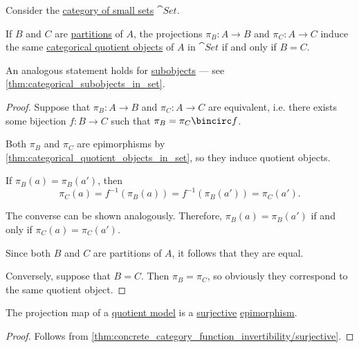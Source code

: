 \begin{proposition}\label{thm:categorical_quotient_objects_in_set}
  Consider the \hyperref[def:category_of_small_sets]{category of small sets} \( \cat{Set} \).

  If \( B \) and \( C \) are \hyperref[def:set_partition]{partitions} of \( A \), the projections \( \pi_B: A \to B \) and \( \pi_C: A \to C \) induce the same \hyperref[def:categorical_quotient_object]{categorical quotient objects} of \( A \) in \( \cat{Set} \) if and only if \( B = C \).
\end{proposition}
\begin{comments}
  \item An analogous statement holds for \hyperref[def:categorical_subobject]{subobjects} --- see \cref{thm:categorical_subobjects_in_set}.
\end{comments}
\begin{proof}
  \SufficiencySubProof Suppose that \( \pi_B: A \to B \) and \( \pi_C: A \to C \) are equivalent, i.e. there exists some bijection \( f: B \to C \) such that \( \pi_B = \pi_C \bincirc f \).

  Both \( \pi_B \) and \( \pi_C \) are epimorphisms by \cref{thm:categorical_quotient_objects_in_set}, so they induce quotient objects.

  If \( \pi_B(a) = \pi_B(a') \), then
  \begin{equation*}
    \pi_C(a) = f^{-1}(\pi_B(a)) = f^{-1}(\pi_B(a')) = \pi_C(a').
  \end{equation*}

  The converse can be shown analogously. Therefore, \( \pi_B(a) = \pi_B(a') \) if and only if \( \pi_C(a) = \pi_C(a') \).

  Since both \( B \) and \( C \) are partitions of \( A \), it follows that they are equal.

  \NecessitySubProof Conversely, suppose that \( B = C \). Then \( \pi_B = \pi_C \), so obviously they correspond to the same quotient object.
\end{proof}

\begin{proposition}\label{thm:fol_quotient_map_is_epimorphism}
  The projection map of a \hyperref[def:fol_quotient_structure/model]{quotient model} is a \hyperref[def:function_invertibility/surjective]{surjective} \hyperref[def:fol_epimorphism]{epimorphism}.
\end{proposition}
\begin{proof}
  Follows from \cref{thm:concrete_category_function_invertibility/surjective}.
\end{proof}

